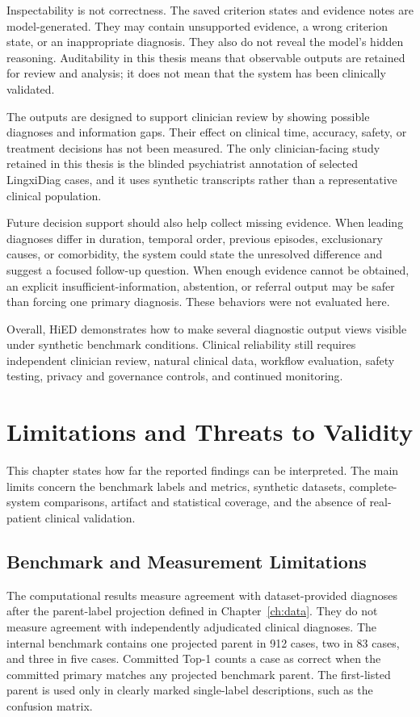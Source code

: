 Inspectability is not correctness. The saved criterion states and evidence notes are model-generated. They may contain unsupported evidence, a wrong criterion state, or an inappropriate diagnosis. They also do not reveal the model's hidden reasoning. Auditability in this thesis means that observable outputs are retained for review and analysis; it does not mean that the system has been clinically validated.

The outputs are designed to support clinician review by showing possible diagnoses and information gaps. Their effect on clinical time, accuracy, safety, or treatment decisions has not been measured. The only clinician-facing study retained in this thesis is the blinded psychiatrist annotation of selected LingxiDiag cases, and it uses synthetic transcripts rather than a representative clinical population.

Future decision support should also help collect missing evidence. When leading diagnoses differ in duration, temporal order, previous episodes, exclusionary causes, or comorbidity, the system could state the unresolved difference and suggest a focused follow-up question. When enough evidence cannot be obtained, an explicit insufficient-information, abstention, or referral output may be safer than forcing one primary diagnosis. These behaviors were not evaluated here.

Overall, HiED demonstrates how to make several diagnostic output views visible under synthetic benchmark conditions. Clinical reliability still requires independent clinician review, natural clinical data, workflow evaluation, safety testing, privacy and governance controls, and continued monitoring.

\chapter{Limitations and Threats to Validity}
\label{ch:limitations}

This chapter states how far the reported findings can be interpreted. The main limits concern the benchmark labels and metrics, synthetic datasets, complete-system comparisons, artifact and statistical coverage, and the absence of real-patient clinical validation.

\section{Benchmark and Measurement Limitations}

The computational results measure agreement with dataset-provided diagnoses after the parent-label projection defined in Chapter~\ref{ch:data}. They do not measure agreement with independently adjudicated clinical diagnoses. The internal benchmark contains one projected parent in 912 cases, two in 83 cases, and three in five cases. Committed Top-1 counts a case as correct when the committed primary matches any projected benchmark parent. The first-listed parent is used only in clearly marked single-label descriptions, such as the confusion matrix.


